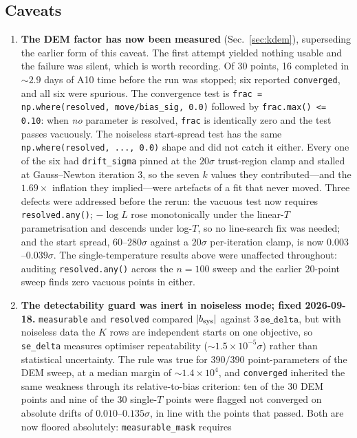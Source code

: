 \documentclass[11pt,a4paper]{article}
\newcommand{\code}[1]{\texttt{#1}}
\begin{document}
\subsection{Caveats}\label{sec:kcaveats}
\begin{enumerate}
\item \textbf{The DEM factor has now been measured} (Sec.~\ref{sec:kdem}),
superseding the earlier form of this caveat. The first attempt yielded nothing
usable and the failure was silent, which is worth recording. Of 30 points, 16
completed in ${\sim}2.9$ days of A10 time before the run was stopped; six
reported \code{converged}, and all six were spurious. The convergence test is
\code{frac = np.where(resolved, move/bias\_sig, 0.0)} followed by
\code{frac.max() <= 0.10}: when \emph{no} parameter is resolved, \code{frac} is
identically zero and the test passes vacuously. The noiseless start-spread test
has the same \code{np.where(resolved, ..., 0.0)} shape and did not catch it
either. Every one of the six had \code{drift\_sigma} pinned at the $20\sigma$
trust-region clamp and stalled at Gauss--Newton iteration 3, so the seven $k$
values they contributed---and the $1.69\times$ inflation they implied---were
artefacts of a fit that never moved. Three defects were addressed before the
rerun: the vacuous test now requires \code{resolved.any()}; $-\log L$ rose
monotonically under the linear-$T$ parametrisation and descends under log-$T$,
so no line-search fix was needed; and the start spread, $60$--$280\sigma$
against a $20\sigma$ per-iteration clamp, is now $0.003$--$0.039\sigma$. The
single-temperature results above were unaffected throughout: auditing
\code{resolved.any()} across the $n{=}100$ sweep and the earlier 20-point sweep
finds zero vacuous points in either.
\item \textbf{The detectability guard was inert in noiseless mode; fixed
2026-09-18.} \code{measurable} and \code{resolved} compared $|b_{\rm sys}|$
against $3\,\code{se\_delta}$, but with noiseless data the $K$ rows are
independent starts on one objective, so \code{se\_delta} measures optimiser
repeatability (${\sim}1.5\times10^{-5}\sigma$) rather than statistical
uncertainty. The rule was true for $390/390$ point-parameters of the DEM sweep,
at a median margin of ${\sim}1.4\times10^{4}$, and \code{converged} inherited
the same weakness through its relative-to-bias criterion: ten of the 30 DEM
points and nine of the 30 single-$T$ points were flagged not converged on
absolute drifts of $0.010$--$0.135\sigma$, in line with the points that passed.
Both are now floored absolutely: \code{measurable\_mask} requires

\end{enumerate}
\end{document}
